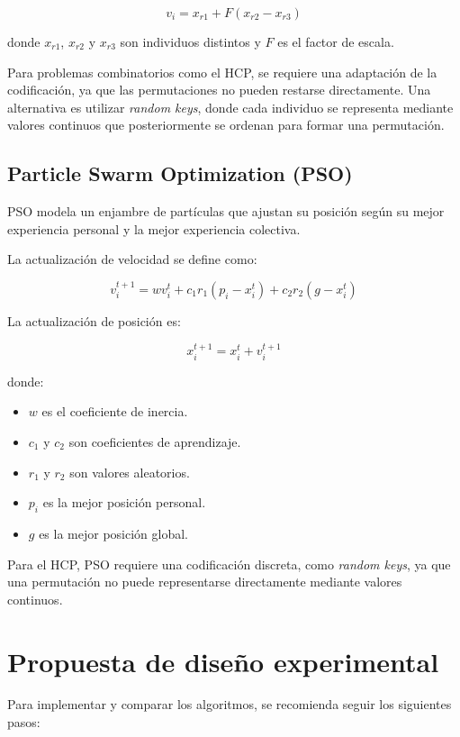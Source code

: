 \documentclass[12pt]{article}
\begin{document}
\[
v_i=x_{r1}+F(x_{r2}-x_{r3})
\]

donde \(x_{r1}\), \(x_{r2}\) y \(x_{r3}\) son individuos distintos y \(F\) es el factor de escala.

Para problemas combinatorios como el HCP, se requiere una adaptación de la codificación, ya que las permutaciones no pueden restarse directamente. Una alternativa es utilizar \textit{random keys}, donde cada individuo se representa mediante valores continuos que posteriormente se ordenan para formar una permutación. \cite{storn}

\subsection{Particle Swarm Optimization (PSO)}

PSO modela un enjambre de partículas que ajustan su posición según su mejor experiencia personal y la mejor experiencia colectiva.

La actualización de velocidad se define como:

\[
v_i^{t+1}=wv_i^t+c_1r_1(p_i-x_i^t)+c_2r_2(g-x_i^t)
\]

La actualización de posición es:

\[
x_i^{t+1}=x_i^t+v_i^{t+1}
\]

donde:

\begin{itemize}
    \item \(w\) es el coeficiente de inercia.
    \item \(c_1\) y \(c_2\) son coeficientes de aprendizaje.
    \item \(r_1\) y \(r_2\) son valores aleatorios.
    \item \(p_i\) es la mejor posición personal.
    \item \(g\) es la mejor posición global.
\end{itemize}

Para el HCP, PSO requiere una codificación discreta, como \textit{random keys}, ya que una permutación no puede representarse directamente mediante valores continuos. \cite{kennedy}

\section{Propuesta de diseño experimental}

Para implementar y comparar los algoritmos, se recomienda seguir los siguientes pasos:
\end{document}
